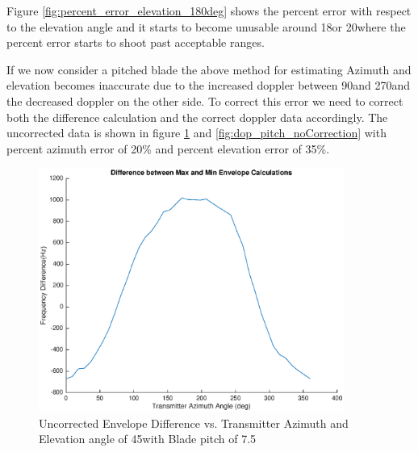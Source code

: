 Figure \ref{fig:percent_error_elevation_180deg} shows the percent error with respect to the elevation angle and it starts to become unusable around 18\textdegree \space or 20\textdegree \space where the percent error starts to shoot past acceptable ranges.


If we now consider a pitched blade the above method for estimating Azimuth and elevation becomes inaccurate due to the increased doppler between 90\textdegree and 270\textdegree and the decreased doppler on the other side. To correct this error we need to correct both the difference calculation and the correct doppler data accordingly. The uncorrected data is shown in figure \ref{fig:diff_pitch_noCorrection} and \ref{fig:dop_pitch_noCorrection} with percent azimuth error of 20\% and percent elevation error of 35\%.

\begin{figure}
	\begin{center}
		\includegraphics[width=10cm]{images/results/difference_pitch_noCorrection.eps}
		\caption{Uncorrected Envelope Difference vs. Transmitter Azimuth and Elevation angle of 45\textdegree with Blade pitch of 7.5\textdegree}
		\label{fig:diff_pitch_noCorrection}
	\end{center}
\end{figure}

